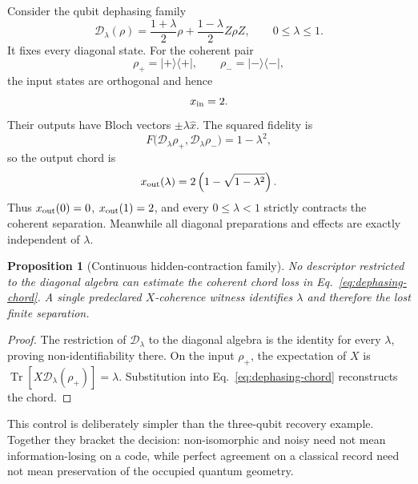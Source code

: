 \documentclass[11pt]{article}
\newtheorem{proposition}{Proposition}
\newcommand{\Tr}{\operatorname{Tr}}
\begin{document}
Consider the qubit dephasing family
\begin{equation}
 \mathcal D_\lambda(\rho)
 =\frac{1+\lambda}{2}\rho+\frac{1-\lambda}{2}Z\rho Z,
 \qquad 0\leq\lambda\leq1.
 \label{eq:partial-dephasing}
\end{equation}
It fixes every diagonal state.  For the coherent pair
\begin{equation}
 \rho_+=|+\rangle\langle+|,
 \qquad
 \rho_-=|-\rangle\langle-|,
\end{equation}
the input states are orthogonal and hence
\begin{equation}
 x_{\rm in}=2.
\end{equation}
Their outputs have Bloch vectors \(\pm\lambda\hat x\).  The squared fidelity is
\begin{equation}
 F\bigl(\mathcal D_\lambda\rho_+,
        \mathcal D_\lambda\rho_-\bigr)=1-\lambda^2,
\end{equation}
so the output chord is
\begin{equation}
 x_{\rm out}(\lambda)=2\left(1-\sqrt{1-\lambda^2}\right).
 \label{eq:dephasing-chord}
\end{equation}
Thus \(x_{\rm out}(0)=0\), \(x_{\rm out}(1)=2\), and every
\(0\leq\lambda<1\) strictly contracts the coherent separation.  Meanwhile all
diagonal preparations and effects are exactly independent of \(\lambda\).

\begin{proposition}[Continuous hidden-contraction family]
No descriptor restricted to the diagonal algebra can estimate the coherent
chord loss in Eq.~\eqref{eq:dephasing-chord}.  A single predeclared
\(X\)-coherence witness identifies \(\lambda\) and therefore the lost finite
separation.
\end{proposition}
\begin{proof}
The restriction of \(\mathcal D_\lambda\) to the diagonal algebra is the
identity for every \(\lambda\), proving non-identifiability there.  On the
input \(\rho_+\), the expectation of \(X\) is
\(\Tr[X\mathcal D_\lambda(\rho_+)]=\lambda\).  Substitution into
Eq.~\eqref{eq:dephasing-chord} reconstructs the chord.
\end{proof}

This control is deliberately simpler than the three-qubit recovery example.
Together they bracket the decision: non-isomorphic and noisy need not mean
information-losing on a code, while perfect agreement on a classical record
need not mean preservation of the occupied quantum geometry.
\end{document}
